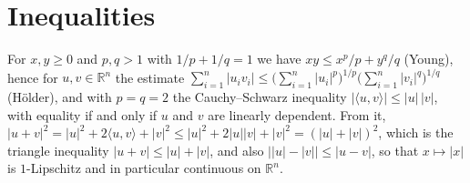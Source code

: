 \documentclass[11pt]{article}
\newcommand{\R}{\mathbb{R}}
\begin{document}
\section*{Inequalities}

For $x, y \ge 0$ and $p, q > 1$ with $1/p + 1/q = 1$ we have $xy \le x^p/p + y^q/q$ (Young), hence for $u, v \in \R^n$ the estimate $\sum_{i=1}^{n} |u_i v_i| \le \bigl( \sum_{i=1}^{n} |u_i|^p \bigr)^{1/p} \bigl( \sum_{i=1}^{n} |v_i|^q \bigr)^{1/q}$ (H\"older), and with $p = q = 2$ the Cauchy--Schwarz inequality $|\langle u, v \rangle| \le |u| \, |v|$, with equality if and only if $u$ and $v$ are linearly dependent. From it, $|u + v|^2 = |u|^2 + 2\langle u, v \rangle + |v|^2 \le |u|^2 + 2|u||v| + |v|^2 = (|u| + |v|)^2$, which is the triangle inequality $|u + v| \le |u| + |v|$, and also $\bigl| |u| - |v| \bigr| \le |u - v|$, so that $x \mapsto |x|$ is $1$-Lipschitz and in particular continuous on $\R^n$.
\end{document}
